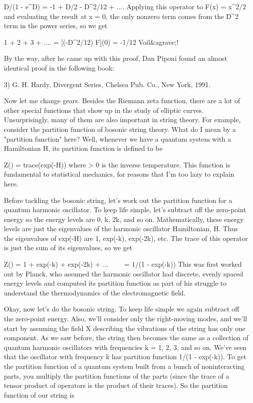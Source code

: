                   D/(1 - e^{D}) = -1 + D/2 - D^{2}/12 + ....
Applying this operator to F(x) = x^{2}/2 and evaluating the result at 
x = 0, the only nonzero term comes from the D^{2} term in the power 
series, so we get 

                1 + 2 + 3 + .... = [(-D^{2}/12) F](0) = -1/12
Voil&agrave;!  

By the way, after he came up with this proof, Dan Piponi found an
almost identical proof in the following book:

3) G. H. Hardy, Divergent Series, Chelsea Pub. Co., New York, 1991.

Now let me change gears.  Besides the Riemann zeta function, there are a
lot of other special functions that show up in the study of elliptic
curves.  Unsurprisingly, many of them are also important in string
theory.  For example, consider the partition function of bosonic string
theory.  What do I mean by a "partition function" here?  Well, whenever
we have a quantum system with a Hamiltonian H, its partition function is
defined to be

                         Z(\beta ) = trace(exp(-\beta H))
where \beta  > 0 is the inverse temperature.  This function is fundamental to
statistical mechanics, for reasons that I'm too lazy to explain here.

Before tackling the bosonic string, let's work out the partition function
for a quantum harmonic oscillator.  To keep life simple, let's subtract
off the zero-point energy so the energy levels are 0, k, 2k, and so on.
Mathematically, these energy levels are just the eigenvalues of the
harmonic oscillator Hamiltonian, H.  Thus the eigenvalues of exp(-\beta H)
are 1, exp(-\beta k), exp(-2\beta k), etc.  The trace of this operator is just 
the sum of its eigenvalues, so we get

           Z(\beta ) = 1 + exp(-\beta k) + exp(-2\beta k) + ...
\  \  \  \ 
                = 1/(1 - exp(-\beta k))
This was first worked out by Planck, who assumed the harmonic oscillator
had discrete, evenly spaced energy levels and computed its partition
function as part of his struggle to understand the thermodynamics of
the electromagnetic field.

Okay, now let's do the bosonic string.  To keep life simple we again
subtract off the zero-point energy.  Also, we'll consider only the
right-moving modes, and we'll start by assuming the field X describing
the vibrations of the string has only one component.  As we saw before,
the string then becomes the same as a collection of quantum harmonic
oscillators with frequencies k = 1, 2, 3, and so on.  We've seen that
the oscillator with frequency k has partition function 1/(1 - exp(-\beta k)).
To get the partition function of a quantum system built from a bunch of
noninteracting parts, you  multiply the partition functions of the parts
(since the trace of a tensor product of operators is the product of their 
traces).  So the partition function of our string is 
                
